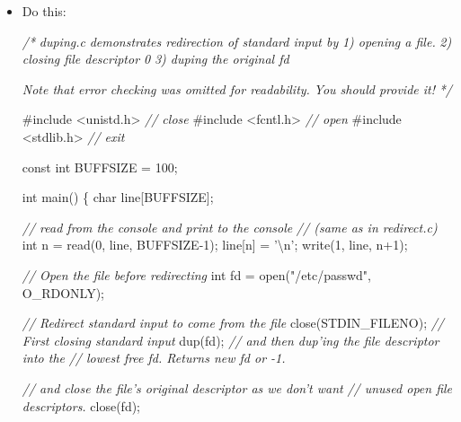 \documentclass[]{article}
\newenvironment{Shaded}{}{}
\newcommand{\DataTypeTok}[1]{\textcolor[rgb]{0.56,0.13,0.00}{#1}}
\newcommand{\DecValTok}[1]{\textcolor[rgb]{0.25,0.63,0.44}{#1}}
\newcommand{\CharTok}[1]{\textcolor[rgb]{0.25,0.44,0.63}{#1}}
\newcommand{\StringTok}[1]{\textcolor[rgb]{0.25,0.44,0.63}{#1}}
\newcommand{\ImportTok}[1]{#1}
\newcommand{\CommentTok}[1]{\textcolor[rgb]{0.38,0.63,0.69}{\textit{#1}}}
\newcommand{\PreprocessorTok}[1]{\textcolor[rgb]{0.74,0.48,0.00}{#1}}
\newcommand{\NormalTok}[1]{#1}
\begin{document}
\begin{itemize}
\item
  Do this:

\begin{Shaded}
\begin{Highlighting}[]
\CommentTok{/*}
\CommentTok{  duping.c}
\CommentTok{  demonstrates redirection of standard input by}
\CommentTok{  1) opening a file.}
\CommentTok{  2) closing file descriptor 0}
\CommentTok{  3) duping the original fd}

\CommentTok{  Note that error checking was omitted for readability.}
\CommentTok{  You should provide it!}
\CommentTok{ */}

\PreprocessorTok{#include }\ImportTok{<unistd.h>}\PreprocessorTok{ }\CommentTok{// close}
\PreprocessorTok{#include }\ImportTok{<fcntl.h>}\PreprocessorTok{  }\CommentTok{// open}
\PreprocessorTok{#include }\ImportTok{<stdlib.h>}\PreprocessorTok{ }\CommentTok{// exit}

\DataTypeTok{const} \DataTypeTok{int}\NormalTok{ BUFFSIZE = }\DecValTok{100}\NormalTok{;}

\DataTypeTok{int}\NormalTok{ main() \{}
    \DataTypeTok{char}\NormalTok{ line[BUFFSIZE];}

    \CommentTok{// read from the console and print to the console}
    \CommentTok{// (same as in redirect.c)}
    \DataTypeTok{int}\NormalTok{ n = read(}\DecValTok{0}\NormalTok{, line, BUFFSIZE}\DecValTok{-1}\NormalTok{);}
\NormalTok{    line[n] = }\CharTok{'\textbackslash{}n'}\NormalTok{;}
\NormalTok{    write(}\DecValTok{1}\NormalTok{, line, n+}\DecValTok{1}\NormalTok{);}

    \CommentTok{// Open the file before redirecting}
    \DataTypeTok{int}\NormalTok{ fd = open(}\StringTok{"/etc/passwd"}\NormalTok{, O_RDONLY);}

    \CommentTok{// Redirect standard input to come from the file}
\NormalTok{    close(STDIN_FILENO);   }\CommentTok{// First closing standard input}
\NormalTok{    dup(fd);    }\CommentTok{// and then dup'ing the file descriptor into the}
                \CommentTok{// lowest free fd. Returns new fd or -1.}

    \CommentTok{// and close the file's original descriptor as we don't want}
    \CommentTok{// unused open file descriptors.}
\NormalTok{    close(fd); }


\end{Highlighting}
\end{Shaded}
\end{itemize}
\end{document}
